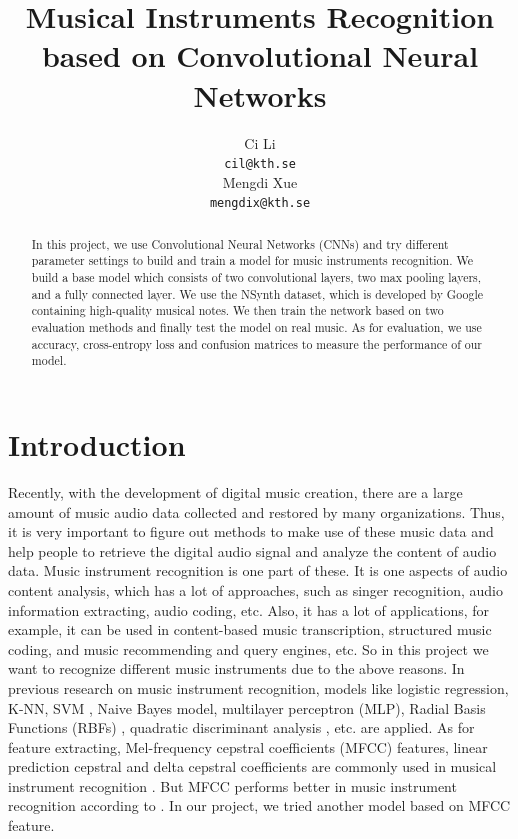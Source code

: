 \documentclass{article}
\title{Musical Instruments Recognition based on Convolutional Neural Networks}
\author{
  Ci Li\\
  \texttt{cil@kth.se} \\
  \And
  Mengdi Xue \\
  \texttt{mengdix@kth.se} \\
}
\begin{document}

\maketitle

\begin{abstract}
  In this project, we use Convolutional Neural Networks (CNNs) and try different parameter settings to build and train a model for music instruments recognition. We build a base model which consists of two convolutional layers, two max pooling layers, and a fully connected layer. We use the NSynth dataset, which is developed by Google containing high-quality musical notes. We then train the network based on two evaluation methods and finally test the model on real music. As for evaluation, we use accuracy, cross-entropy loss and confusion matrices to measure the performance of our model. 
\end{abstract}

\section{Introduction}

Recently, with the development of digital music creation, there are a large amount of music audio data collected and restored by many organizations. Thus, it is very important to figure out methods to make use of these music data and help people to retrieve the digital audio signal and analyze the content of audio data. Music instrument recognition is one part of these. It is one aspects of audio content analysis, which has a lot of approaches, such as singer recognition, audio information extracting, audio coding, etc. Also, it has a lot of applications, for example, it can be used in content-based music transcription, structured music coding, and music recommending and query engines, etc. So in this project we want to recognize different music instruments due to the above reasons. In previous research on music instrument recognition, models like logistic regression, K-NN, SVM \cite{sell}, Naive Bayes model, multilayer perceptron (MLP), Radial Basis Functions (RBFs) \cite{deng}, quadratic discriminant analysis \cite{agostini}, etc. are applied. As for feature extracting, Mel-frequency cepstral coefficients (MFCC) features, linear prediction cepstral and delta cepstral coefficients are commonly used in musical instrument recognition . But MFCC performs better in music instrument recognition according to \cite{eronen}. In our project, we tried another model based on MFCC feature.
\end{document}
